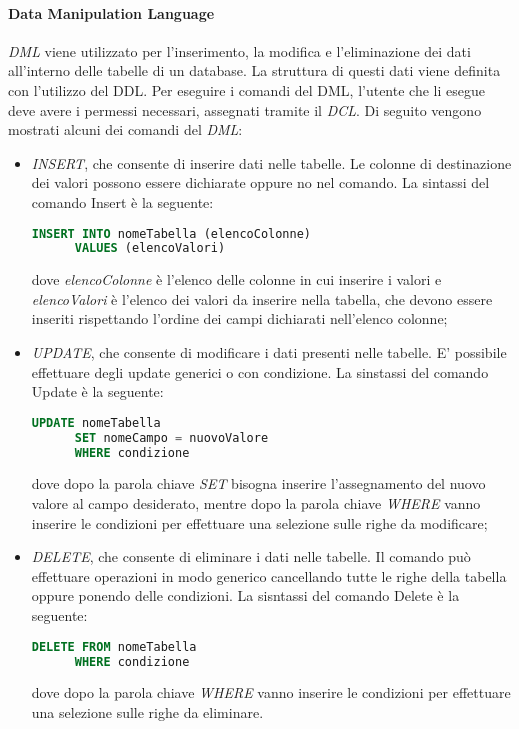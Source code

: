   \paragraph{Data Manipulation Language}
  \textit{DML} viene utilizzato per l'inserimento, la modifica e l'eliminazione dei dati all'interno delle tabelle
  di un database. La struttura di questi dati viene definita con l'utilizzo del DDL. Per eseguire i comandi del DML, l'utente
  che li esegue deve avere i permessi necessari, assegnati tramite il \textit{DCL}. Di seguito vengono mostrati alcuni dei 
  comandi del \textit{DML}:
  \begin{itemize}
    \item \textit{INSERT}, che consente di inserire dati nelle tabelle. Le colonne di destinazione dei valori possono
    essere dichiarate oppure no nel comando. La sintassi del comando Insert è la seguente:
    \begin{lstlisting}[language=sql]
      INSERT INTO nomeTabella (elencoColonne)
      VALUES (elencoValori)
    \end{lstlisting}
    dove \textit{elencoColonne} è l'elenco delle colonne in cui inserire i valori e \textit{elencoValori} è l'elenco
    dei valori da inserire nella tabella, che devono essere inseriti rispettando l'ordine dei campi dichiarati nell'elenco colonne;
    \item \textit{UPDATE}, che consente di modificare i dati presenti nelle tabelle. E' possibile effettuare degli update generici
    o con condizione. La sinstassi del comando Update è la seguente:
    \begin{lstlisting}[language=sql]
      UPDATE nomeTabella 
      SET nomeCampo = nuovoValore 
      WHERE condizione
    \end{lstlisting}
    dove dopo la parola chiave \textit{SET} bisogna inserire l'assegnamento del nuovo valore al campo desiderato, mentre dopo
    la parola chiave \textit{WHERE} vanno inserire le condizioni per effettuare una selezione sulle righe da modificare; 
    \item \textit{DELETE}, che consente di eliminare i dati nelle tabelle. Il comando può effettuare operazioni in modo generico
    cancellando tutte le righe della tabella oppure ponendo delle condizioni. La sisntassi del comando Delete è la seguente:
    \begin{lstlisting}[language=sql]
      DELETE FROM nomeTabella 
      WHERE condizione
    \end{lstlisting}
    dove dopo la parola chiave \textit{WHERE} vanno inserire le condizioni per effettuare una selezione sulle righe da 
    eliminare. 
  \end{itemize}
  
